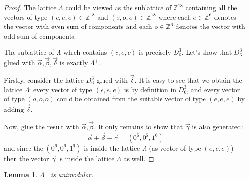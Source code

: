 \documentclass{article}
\newcommand{\ZZ}{\mathbb{Z}}
\newcommand{\de}{\delta}
\theoremstyle{plain}
\newtheorem{lemma}[theorem]{Lemma}
\theoremstyle{definition}
\begin{document}
    \begin{proof}
        The lattice $\Lambda$ could be viewed as the sublattice of $\ZZ^{18}$ containing all
        the vectors of type $(e, e, e) \in \ZZ^{18}$ 
        and $(o, o, o) \in \ZZ^{18}$ where each $e \in \ZZ^6$ denotes the
        vector with even sum of components and each $o \in \ZZ^6$ denotes the vector with odd sum
        of components.

        The sublattice of $\Lambda$ which contains $(e, e, e)$ is precisely
        $D_6^3$. Let's show that 
        $D_6^3$ glued with $\vec{\alpha}, \vec{\beta}, {\vec{\de}}$ is 
        exactly $\Lambda^+$.

        Firstly, consider the lattice $D_6^3$ glued with ${\vec{\de}}$. It is easy to see
        that we obtain the lattice $\Lambda$: every vector of type $(e, e, e)$ is 
        by definition in $D_6^3$, and every vector of type $(o, o, o)$ could be obtained from
        the suitable vector of type $(e, e, e)$ by adding ${\vec{\de}}$.

        Now, glue the result with $\vec{\alpha}, \vec{\beta}$. It only remains to show that $\vec{\gamma}$
        is also generated:
        $$
        \vec{\alpha} + \vec{\beta} - \vec{\gamma}=(0^6, 0^6, 1^6)
        $$
        and since the $(0^6, 0^6, 1^6)$ is inside the lattice $\Lambda$ (as vector of type $(e, e, e)$)
        then the vector $\vec{\gamma}$ is inside the lattice $\Lambda$ as well.
    \end{proof}

    \begin{lemma}
        $\Lambda^+$ is unimodular.
    \end{lemma}
\end{document}
